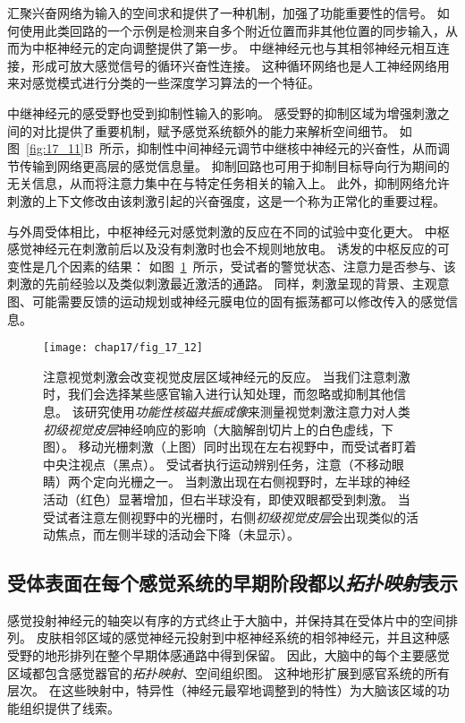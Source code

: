 汇聚兴奋网络为输入的空间求和提供了一种机制，加强了功能重要性的信号。
如何使用此类回路的一个示例是检测来自多个附近位置而非其他位置的同步输入，从而为中枢神经元的定向调整提供了第一步。 
中继神经元也与其相邻神经元相互连接，形成可放大感觉信号的循环兴奋性连接。 
这种循环网络也是人工神经网络用来对感觉模式进行分类的一些深度学习算法的一个特征。


中继神经元的感受野也受到抑制性输入的影响。 
感受野的抑制区域为增强刺激之间的对比提供了重要机制，赋予感觉系统额外的能力来解析空间细节。 
如图~\ref{fig:17_11}B~所示，抑制性中间神经元调节中继核中神经元的兴奋性，从而调节传输到网络更高层的感觉信息量。
抑制回路也可用于抑制目标导向行为期间的无关信息，从而将注意力集中在与特定任务相关的输入上。 
此外，抑制网络允许刺激的上下文修改由该刺激引起的兴奋强度，这是一个称为正常化的重要过程。


与外周受体相比，中枢神经元对感觉刺激的反应在不同的试验中变化更大。 
中枢感觉神经元在刺激前后以及没有刺激时也会不规则地放电。 
诱发的中枢反应的可变性是几个因素的结果：
如图~\ref{fig:17_12}~所示，受试者的警觉状态、注意力是否参与、该刺激的先前经验以及类似刺激最近激活的通路。
同样，刺激呈现的背景、主观意图、可能需要反馈的运动规划或神经元膜电位的固有振荡都可以修改传入的感觉信息。


\begin{figure}[htbp]
	\centering
	\texttt{[image: chap17/fig\_17\_12]}
	\caption{注意视觉刺激会改变视觉皮层区域神经元的反应。 
		当我们注意刺激时，我们会选择某些感官输入进行认知处理，而忽略或抑制其他信息。
		该研究使用\textit{功能性核磁共振成像}来测量视觉刺激注意力对人类\textit{初级视觉皮层}神经响应的影响（大脑解剖切片上的白色虚线，下图）。 
		移动光栅刺激（上图）同时出现在左右视野中，而受试者盯着中央注视点（黑点）。 
		受试者执行运动辨别任务，注意（不移动眼睛）两个定向光栅之一。 
		当刺激出现在右侧视野时，左半球的神经活动（红色）显著增加，但右半球没有，即使双眼都受到刺激。 
		当受试者注意左侧视野中的光栅时，右侧\textit{初级视觉皮层}会出现类似的活动焦点，而左侧半球的活动会下降（未显示）\cite{gandhi1999spatial}。}
	\label{fig:17_12}
\end{figure}


\subsection{受体表面在每个感觉系统的早期阶段都以\textit{拓扑映射}表示}

感觉投射神经元的轴突以有序的方式终止于大脑中，并保持其在受体片中的空间排列。 
皮肤相邻区域的感觉神经元投射到中枢神经系统的相邻神经元，并且这种感受野的地形排列在整个早期体感通路中得到保留。 
因此，大脑中的每个主要感觉区域都包含感觉器官的\textit{拓扑映射}、空间组织图。
这种地形扩展到感官系统的所有层次。 
在这些映射中，特异性（神经元最窄地调整到的特性）为大脑该区域的功能组织提供了线索。


